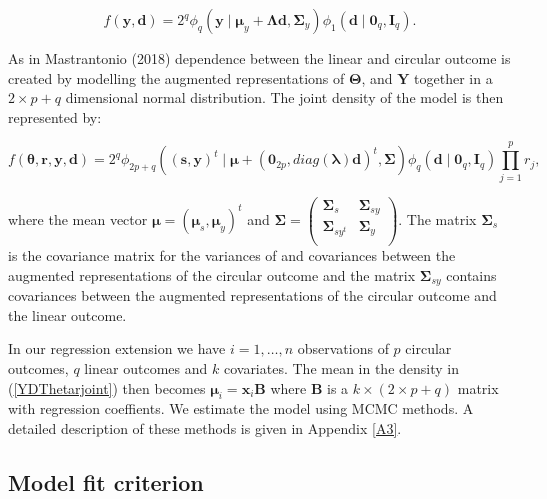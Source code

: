 \documentclass[11pt,]{article}
\begin{document}
\begin{equation}\label{YDjoint}
f(\boldsymbol{y}, \boldsymbol{d}) = 2^q\phi_q(\boldsymbol{y} \mid \boldsymbol{\mu}_y + \boldsymbol{\Lambda}\boldsymbol{d}, \boldsymbol{\Sigma}_y) \phi_1(\boldsymbol{d} \mid \boldsymbol{0}_q, \boldsymbol{I}_q).
\end{equation}

As in Mastrantonio (2018) dependence between the linear and circular
outcome is created by modelling the augmented representations of
\(\boldsymbol{\Theta}\), and \(\boldsymbol{Y}\) together in a
\(2 \times p + q\) dimensional normal distribution. The joint density of
the model is then represented by:

\begin{equation}\label{YDThetarjoint}
f(\boldsymbol{\theta}, \boldsymbol{r}, \boldsymbol{y}, \boldsymbol{d}) = 2^q\phi_{2p+q}((\boldsymbol{s}, \boldsymbol{y})^t \mid \boldsymbol{\mu} + (\boldsymbol{0}_{2p}, diag(\boldsymbol{\lambda})\boldsymbol{d})^t, \boldsymbol{\Sigma}) \phi_q(\boldsymbol{d} \mid \boldsymbol{0}_q, \boldsymbol{I}_q) \prod_{j = 1}^{p}r_j,
\end{equation}

where the mean vector
\(\boldsymbol{\mu} = (\boldsymbol{\mu}_s, \boldsymbol{\mu}_y)^t\) and
\(\boldsymbol{\Sigma} = \left ( \begin{matrix} \boldsymbol{\Sigma}_s & \boldsymbol{\Sigma}_{sy} \\ \boldsymbol{\Sigma}_{sy^t} & \boldsymbol{\Sigma}_y \\ \end{matrix} \right )\).
The matrix \(\boldsymbol{\Sigma}_s\) is the covariance matrix for the
variances of and covariances between the augmented representations of
the circular outcome and the matrix \(\boldsymbol{\Sigma}_{sy}\)
contains covariances between the augmented representations of the
circular outcome and the linear outcome.

In our regression extension we have \(i = 1, \dots, n\) observations of
\(p\) circular outcomes, \(q\) linear outcomes and \(k\) covariates. The
mean in the density in (\ref{YDThetarjoint}) then becomes
\(\boldsymbol{\mu}_i = \boldsymbol{x}_i\boldsymbol{B}\) where
\(\boldsymbol{B}\) is a \(k \times (2 \times p + q)\) matrix with
regression coeffients. We estimate the model using MCMC methods. A
detailed description of these methods is given in Appendix \ref{A3}.

\subsection{Model fit criterion}\label{Modelfit}
\end{document}
